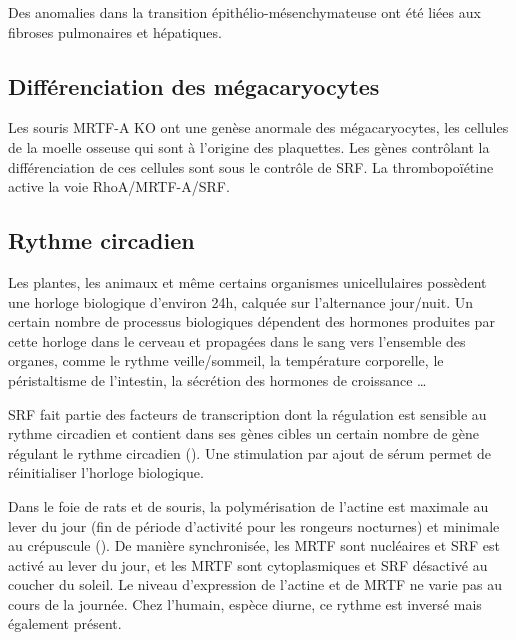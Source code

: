 \documentclass{report}
\begin{document}
Des anomalies dans la transition épithélio-mésenchymateuse ont été liées aux fibroses pulmonaires et hépatiques.

\subsection{Différenciation des mégacaryocytes}

Les souris MRTF-A KO ont une genèse anormale des mégacaryocytes, les cellules de la moelle osseuse qui sont à l'origine des plaquettes. Les gènes contrôlant la différenciation de ces cellules sont sous le contrôle de SRF. La thrombopoïétine active la voie RhoA/MRTF-A/SRF. 

\subsection{Rythme circadien}

Les plantes, les animaux et même certains organismes unicellulaires possèdent une horloge biologique d'environ 24h, calquée sur l'alternance jour/nuit. Un certain nombre de processus biologiques dépendent des hormones produites par cette horloge dans le cerveau et propagées dans le sang vers l'ensemble des organes, comme le rythme veille/sommeil, la température corporelle, le péristaltisme de l'intestin, la sécrétion des hormones de croissance \dots 

SRF fait partie des facteurs de transcription dont la régulation est sensible au rythme circadien et contient dans ses gènes cibles un certain nombre de gène régulant le rythme circadien (\cite{esnault_rho-actin_2014}). Une stimulation par ajout de sérum permet de réinitialiser l'horloge biologique.

Dans le foie de rats et de souris, la polymérisation de l'actine est maximale au lever du jour (fin de période d'activité pour les rongeurs nocturnes) et minimale au crépuscule (\cite{gerber_blood-borne_2013}). De manière synchronisée, les MRTF sont nucléaires et SRF est activé au lever du jour, et les MRTF sont cytoplasmiques et SRF désactivé au coucher du soleil. Le niveau d'expression de l'actine et de MRTF ne varie pas au cours de la journée. Chez l'humain, espèce diurne, ce rythme est inversé mais également présent. 
\end{document}
